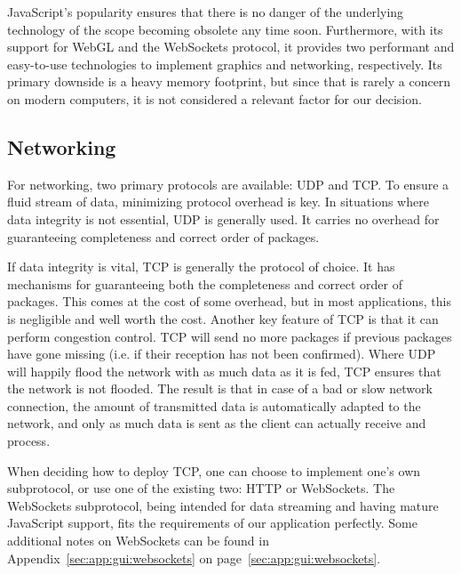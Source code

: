 JavaScript's  popularity ensures  that there  is no  danger of  the underlying
technology  of  the  scope   becoming  obsolete  any  time  soon. Furthermore,
with  its support  for  WebGL and  the WebSockets  protocol,  it provides  two
performant and easy-to-use technologies  to implement graphics and networking,
respectively. Its primary downside is a heavy memory footprint, but since that
is  rarely a  concern on  modern computers,  it is  not considered  a relevant
factor for our decision.

%
%
\subsection{Networking} %
\label{subsec:gui:networking}

For networking, two primary protocols are available: UDP and TCP.  To ensure a
fluid stream of data, minimizing protocol overhead is key. In situations where
data integrity is not essential, UDP is generally used. It carries no overhead
for guaranteeing completeness and correct order of packages.

If data  integrity is vital, TCP  is generally the protocol  of choice. It has
mechanisms  for  guaranteeing  both  the completeness  and  correct  order  of
packages.  This comes at the cost  of some overhead, but in most applications,
this is negligible and well worth the cost. Another key feature of TCP is that
it can perform congestion control. TCP will  send no more packages if previous
packages  have  gone missing  (i.e. if  their  reception has  not  been
confirmed).  Where UDP will happily flood the network with as much data as it
is fed,  TCP ensures that  the network is not  flooded. The result is  that in
case of a  bad or slow network  connection, the amount of  transmitted data is
automatically adapted  to the network,  and only as much  data is sent  as the
client can actually receive and process.

When  deciding how  to  deploy TCP,  one  can choose  to  implement one's  own
subprotocol,  or  use  one  of   the  existing  two: HTTP  or  WebSockets. The
WebSockets  subprotocol,   being  intended  for  data   streaming  and  having
mature  JavaScript   support,  fits   the  requirements  of   our  application
perfectly.    Some  additional   notes   on  WebSockets   can   be  found   in
Appendix~\ref{sec:app:gui:websockets} on page~\ref{sec:app:gui:websockets}.

